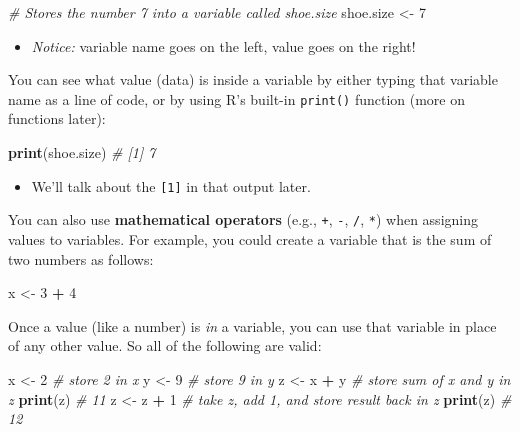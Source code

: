 \documentclass[]{book}
\newenvironment{Shaded}{\begin{snugshade}}{\end{snugshade}}
\newcommand{\KeywordTok}[1]{\textcolor[rgb]{0.13,0.29,0.53}{\textbf{#1}}}
\newcommand{\DecValTok}[1]{\textcolor[rgb]{0.00,0.00,0.81}{#1}}
\newcommand{\StringTok}[1]{\textcolor[rgb]{0.31,0.60,0.02}{#1}}
\newcommand{\CommentTok}[1]{\textcolor[rgb]{0.56,0.35,0.01}{\textit{#1}}}
\newcommand{\OperatorTok}[1]{\textcolor[rgb]{0.81,0.36,0.00}{\textbf{#1}}}
\newcommand{\NormalTok}[1]{#1}
\providecommand{\tightlist}{%
  \setlength{\itemsep}{0pt}\setlength{\parskip}{0pt}}
\theoremstyle{definition}
\theoremstyle{definition}
\theoremstyle{remark}
\begin{document}
\begin{Shaded}
\begin{Highlighting}[]
\CommentTok{# Stores the number 7 into a variable called shoe.size}
\NormalTok{shoe.size <-}\StringTok{ }\DecValTok{7}
\end{Highlighting}
\end{Shaded}

\begin{itemize}
\tightlist
\item
  \emph{Notice:} variable name goes on the left, value goes on the
  right!
\end{itemize}

You can see what value (data) is inside a variable by either typing that
variable name as a line of code, or by using R's built-in
\texttt{print()} function (more on functions later):

\begin{Shaded}
\begin{Highlighting}[]
\KeywordTok{print}\NormalTok{(shoe.size)}
\CommentTok{# [1] 7}
\end{Highlighting}
\end{Shaded}

\begin{itemize}
\tightlist
\item
  We'll talk about the \texttt{{[}1{]}} in that output later.
\end{itemize}

You can also use \textbf{mathematical operators} (e.g., \texttt{+},
\texttt{-}, \texttt{/}, \texttt{*}) when assigning values to variables.
For example, you could create a variable that is the sum of two numbers
as follows:

\begin{Shaded}
\begin{Highlighting}[]
\NormalTok{x <-}\StringTok{ }\DecValTok{3} \OperatorTok{+}\StringTok{ }\DecValTok{4}
\end{Highlighting}
\end{Shaded}

Once a value (like a number) is \emph{in} a variable, you can use that
variable in place of any other value. So all of the following are valid:

\begin{Shaded}
\begin{Highlighting}[]
\NormalTok{x <-}\StringTok{ }\DecValTok{2}  \CommentTok{# store 2 in x}
\NormalTok{y <-}\StringTok{ }\DecValTok{9}  \CommentTok{# store 9 in y}
\NormalTok{z <-}\StringTok{ }\NormalTok{x }\OperatorTok{+}\StringTok{ }\NormalTok{y  }\CommentTok{# store sum of x and y in z}
\KeywordTok{print}\NormalTok{(z)  }\CommentTok{# 11}
\NormalTok{z <-}\StringTok{ }\NormalTok{z }\OperatorTok{+}\StringTok{ }\DecValTok{1}  \CommentTok{# take z, add 1, and store result back in z}
\KeywordTok{print}\NormalTok{(z)  }\CommentTok{# 12}
\end{Highlighting}
\end{Shaded}
\end{document}
